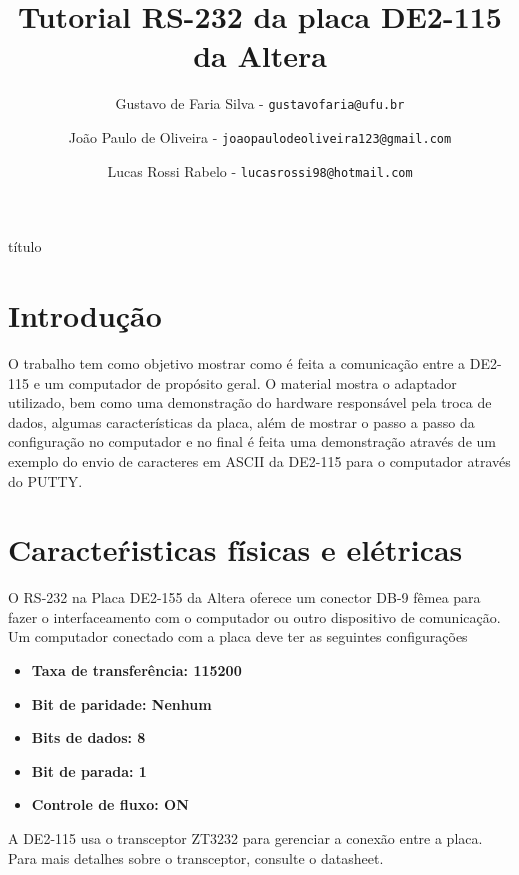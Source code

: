 \documentclass[12pt,a4paper]{article} %
\begin{document}
\title{Tutorial RS-232 da placa DE2-115 da Altera\vspace{3.5cm}} %
título
\author{
	Gustavo de Faria Silva - 
	\texttt{gustavofaria@ufu.br}
	\and
	João Paulo de Oliveira - 
	\texttt{joaopaulodeoliveira123@gmail.com}
	\and
	Lucas Rossi Rabelo - 
	\texttt{lucasrossi98@hotmail.com}
	\vspace*{11.6cm}
}

%
\maketitle %
\thispagestyle{empty}
\pagebreak

\tableofcontents %
\thispagestyle{empty}
\pagebreak %
\section{Introdução}
O trabalho tem como objetivo mostrar como é feita a comunicação entre a 
DE2-115 e um computador de propósito geral. O material mostra o 
adaptador utilizado, bem como uma demonstração do hardware responsável 
pela troca de dados, algumas características da placa, além de mostrar o 
passo a passo da configuração no computador e no final é feita uma 
demonstração através de um exemplo do envio de caracteres em ASCII da 
DE2-115 para o computador através do PUTTY.

\section{Caracteŕisticas físicas e elétricas}
O RS-232 na Placa DE2-155 da Altera oferece um conector DB-9 fêmea para 
fazer o interfaceamento com o computador ou outro dispositivo de 
comunicação. Um computador conectado com a placa deve ter as seguintes 
configurações\cite{man}
\begin{itemize}
	\item \bf{Taxa de transferência:} 115200
    \item \bf{Bit de paridade:} Nenhum
    \item \bf{Bits de dados:} 8
    \item \bf{Bit de parada:} 1
    \item \bf{Controle de fluxo:} ON
\end{itemize}
A DE2-115 usa o transceptor ZT3232 para gerenciar a conexão entre a 
placa. Para mais detalhes sobre o transceptor, consulte o datasheet. 
\end{document}

